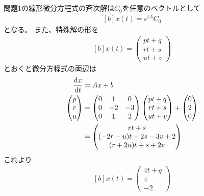 \documentclass[../ap_2014.tex]{subfiles}
\begin{document}
\subsection{}
問題1の線形微分方程式の斉次解は\(C_0\)を任意のベクトルとして
\begin{equation}\begin{aligned}[b]
    x(t) = e^{tA}C_0
\end{aligned}\end{equation}
となる。
また、特殊解の形を
\begin{equation}\begin{aligned}[b]
    x(t) = \begin{pmatrix}
        pt + q\\
        rt + s\\
        ut + v
    \end{pmatrix}
\end{aligned}\end{equation}
とおくと微分方程式の両辺は
\begin{equation}\begin{aligned}[b]
    \dv{x}{t} &= Ax+b\\
    \begin{pmatrix}
        p\\
        r\\
        u
    \end{pmatrix}
    &= \begin{pmatrix}
        0 & 1 & 0\\
        0 & -2 & -3\\
        0 & 1 & 2
    \end{pmatrix}
    \begin{pmatrix}
        pt + q\\
        rt + s\\
        ut + v
    \end{pmatrix}
    +\begin{pmatrix}
        0 \\
        2 \\
        0
    \end{pmatrix}\\
    &= \begin{pmatrix}
        rt+s\\
        (-2r-u)t-2s-3v+2\\
        (r+2u)t +s+2v
    \end{pmatrix}
\end{aligned}\end{equation}
これより
\begin{equation}\begin{aligned}[b]
    x(t)=\begin{pmatrix}
        4t+q\\
        4\\
        -2
    \end{pmatrix}
\end{aligned}\end{equation}
\end{document}

